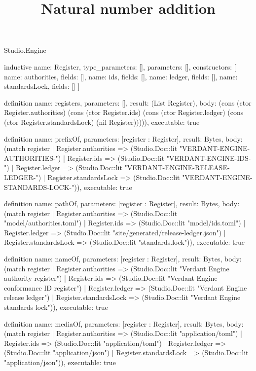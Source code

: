 \begin{lexlean}{Studio.Engine}
\title{Natural number addition}
\begin{semanticmodule}
inductive{
  name: Register,
  type_parameters: [],
  parameters: [],
  constructors: [
    {name: authorities, fields: []},
    {name: ids, fields: []},
    {name: ledger, fields: []},
    {name: standardsLock, fields: []}
  ]
}

definition{
  name: registers,
  parameters: [],
  result: (List Register),
  body: (cons (ctor Register.authorities) (cons (ctor Register.ids) (cons (ctor Register.ledger) (cons (ctor Register.standardsLock) (nil Register))))),
  executable: true
}

definition{
  name: prefixOf,
  parameters: [register : Register],
  result: Bytes,
  body: (match register
    | Register.authorities => (Studio.Doc::lit "VERDANT-ENGINE-AUTHORITIES-")
    | Register.ids => (Studio.Doc::lit "VERDANT-ENGINE-IDS-")
    | Register.ledger => (Studio.Doc::lit "VERDANT-ENGINE-RELEASE-LEDGER-")
    | Register.standardsLock => (Studio.Doc::lit "VERDANT-ENGINE-STANDARDS-LOCK-")),
  executable: true
}

definition{
  name: pathOf,
  parameters: [register : Register],
  result: Bytes,
  body: (match register
    | Register.authorities => (Studio.Doc::lit "model/authorities.toml")
    | Register.ids => (Studio.Doc::lit "model/ids.toml")
    | Register.ledger => (Studio.Doc::lit "site/generated/release-ledger.json")
    | Register.standardsLock => (Studio.Doc::lit "standards.lock")),
  executable: true
}

definition{
  name: nameOf,
  parameters: [register : Register],
  result: Bytes,
  body: (match register
    | Register.authorities => (Studio.Doc::lit "Verdant Engine authority register")
    | Register.ids => (Studio.Doc::lit "Verdant Engine conformance ID register")
    | Register.ledger => (Studio.Doc::lit "Verdant Engine release ledger")
    | Register.standardsLock => (Studio.Doc::lit "Verdant Engine standards lock")),
  executable: true
}

definition{
  name: mediaOf,
  parameters: [register : Register],
  result: Bytes,
  body: (match register
    | Register.authorities => (Studio.Doc::lit "application/toml")
    | Register.ids => (Studio.Doc::lit "application/toml")
    | Register.ledger => (Studio.Doc::lit "application/json")
    | Register.standardsLock => (Studio.Doc::lit "application/json")),
  executable: true
}


\end{semanticmodule}
\end{lexlean}
